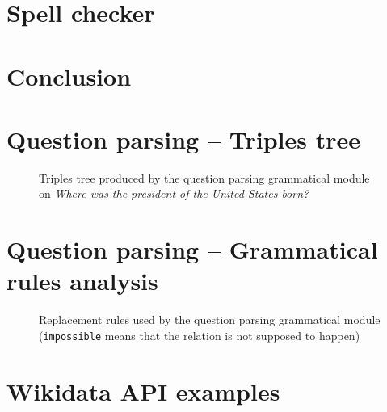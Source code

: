 \documentclass[a4paper,10pt]{report}
\begin{document}
\chapter{Spell checker}
    

\chapter*{Conclusion}
    



\nocite{*}

\appendix

\chapter{Question parsing \--- Triples tree}

\begin{figure}[!ht]

\caption{Triples tree produced by the question parsing grammatical module on \textit{Where was the president of the United States born?}}
\label{triple_tree}
\end{figure}

\chapter{Question parsing \--- Grammatical rules analysis}

\begin{figure}[!ht]

\caption{Replacement rules used by the question parsing grammatical module (\texttt{impossible} means that the relation is not supposed to happen)}
\label{gramm_rule}
\end{figure}

\chapter{Wikidata API examples}

\end{document}
